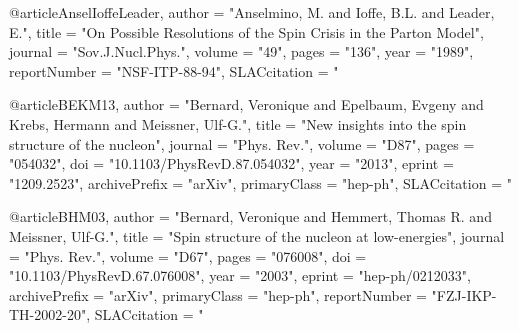 @article{AnselIoffeLeader,
      author         = "Anselmino, M. and Ioffe, B.L. and Leader, E.",
      title          = "{On Possible Resolutions of the Spin Crisis in the Parton Model}",
      journal        = "Sov.J.Nucl.Phys.",
      volume         = "49",
      pages          = "136",
      year           = "1989",
      reportNumber   = "NSF-ITP-88-94",
      SLACcitation   = "%
}

@article{BEKM13,
      author         = "Bernard, Veronique and Epelbaum, Evgeny and Krebs, Hermann and Meissner, Ulf-G.",
      title          = "{New insights into the spin structure of the nucleon}",
      journal        = "Phys. Rev.",
      volume         = "D87",
      pages          = "054032",
      doi            = "10.1103/PhysRevD.87.054032",
      year           = "2013",
      eprint         = "1209.2523",
      archivePrefix  = "arXiv",
      primaryClass   = "hep-ph",
      SLACcitation   = "%
}

@article{BHM03,
      author         = "Bernard, Veronique and Hemmert, Thomas R. and Meissner, Ulf-G.",
      title          = "{Spin structure of the nucleon at low-energies}",
      journal        = "Phys. Rev.",
      volume         = "D67",
      pages          = "076008",
      doi            = "10.1103/PhysRevD.67.076008",
      year           = "2003",
      eprint         = "hep-ph/0212033",
      archivePrefix  = "arXiv",
      primaryClass   = "hep-ph",
      reportNumber   = "FZJ-IKP-TH-2002-20",
      SLACcitation   = "%
}

